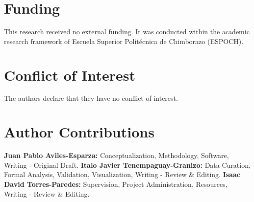 \documentclass[10pt, a4paper, oneside]{article}
\begin{document}
\section*{Funding}
This research received no external funding. It was conducted within the academic research framework of Escuela Superior Polit\'ecnica de Chimborazo (ESPOCH).

\section*{Conflict of Interest}
The authors declare that they have no conflict of interest.

\section*{Author Contributions}
\textbf{Juan Pablo Aviles-Esparza:} Conceptualization, Methodology, Software, Writing - Original Draft. \textbf{Italo Javier Tenempaguay-Granizo:} Data Curation, Formal Analysis, Validation, Visualization, Writing - Review \& Editing. \textbf{Isaac David Torres-Paredes:} Supervision, Project Administration, Resources, Writing - Review \& Editing.




\end{document}
